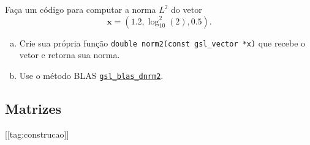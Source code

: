 \documentclass[12pt]{article}
\begin{document}
\begin{exr}
  Faça um código para computar a norma $L^2$ do vetor
  \begin{equation}
    \pmb{x} = (1.2, \log_{10}^2(2), 0.5).
  \end{equation}
  \begin{enumerate}[a)]
  \item Crie sua própria função \lstinline+double norm2(const gsl_vector *x)+ que recebe o vetor e retorna sua norma.
  \item Use o método BLAS \href{https://www.gnu.org/software/gsl/doc/html/blas.html\#c.gsl_blas_dnrm2}{\lstinline+gsl_blas_dnrm2+}.
  \end{enumerate}
\end{exr}

\subsection{Matrizes}\label{sec_mat_subsec_mat}

[[tag:construcao]]


\end{document}
